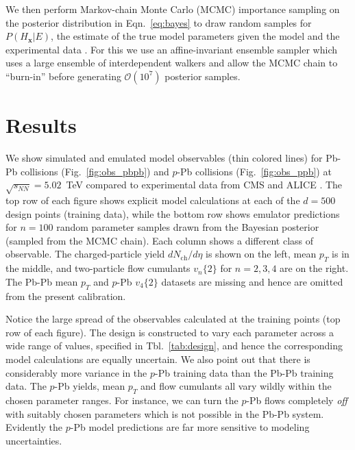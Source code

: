 \documentclass[aps,prc,reprint,amsmath,nofootinbib]{revtex4-1}
\newcommand{\sqrts}{\sqrt{s_{NN}}}
\newcommand{\nch}{N_\text{ch}}
\newcommand{\x}{\mathbf{x}}
\newcommand{\vnk}[2]{v_#1\{#2\}}
\newcommand{\order}[1]{$\mathcal O(10^{#1})$}
\begin{document}
We then perform Markov-chain Monte Carlo (MCMC) importance sampling on the posterior distribution in Eqn.~\eqref{eq:bayes} to draw random samples for $P(H_\x | E)$, the estimate of the true model parameters given the model and the experimental data \cite{Goodman:2010en, FM:2013mc}.
For this we use an affine-invariant ensemble sampler which uses a large ensemble of interdependent walkers \cite{Goodman:2010en, FM:2013mc} and allow the MCMC chain to ``burn-in'' before generating \order{7} posterior samples.


\section{Results}
\label{sec:results}

We show simulated and emulated model observables (thin colored lines) for Pb-Pb collisions (Fig.~\ref{fig:obs_pbpb}) and \mbox{$p$-Pb} collisions (Fig.~\ref{fig:obs_ppb}) at $\sqrts=5.02$~TeV compared to experimental data from CMS \cite{Chatrchyan:2013nka} and ALICE \cite{Adam:2015ptt, Adam:2016izf, Adam:2014qja, Abelev:2013bla}.
The top row of each figure shows explicit model calculations at each of the $d=500$ design points (training data), while the bottom row shows emulator predictions for $n=100$ random parameter samples drawn from the Bayesian posterior (sampled from the MCMC chain).
Each column shows a different class of observable.
The charged-particle yield $d\nch/d\eta$ is shown on the left, mean $p_T$ is in the middle, and two-particle flow cumulants $\vnk{n}{2}$ for $n=2,3,4$ are on the right.
The Pb-Pb mean $p_T$ and $p$-Pb $\vnk{4}{2}$ datasets are missing and hence are omitted from the present calibration.

Notice the large spread of the observables calculated at the training points (top row of each figure).
The design is constructed to vary each parameter across a wide range of values, specified in Tbl.~\ref{tab:design}, and hence the corresponding model calculations are equally uncertain.
We also point out that there is considerably more variance in the $p$-Pb training data than the Pb-Pb training data.
The $p$-Pb yields, mean $p_T$ and flow cumulants all vary wildly within the chosen parameter ranges.
For instance, we can turn the $p$-Pb flows completely \emph{off} with suitably chosen parameters which is not possible in the Pb-Pb system.
Evidently the $p$-Pb model predictions are far more sensitive to modeling uncertainties.
\end{document}
